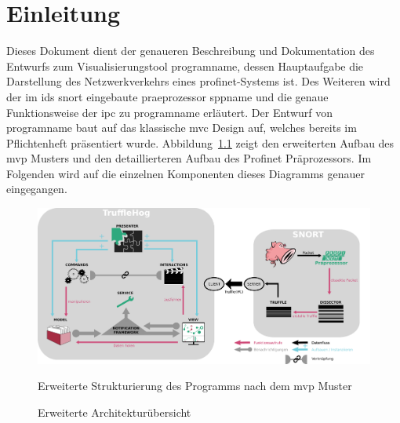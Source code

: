\chapter{Einleitung}
Dieses Dokument dient der genaueren Beschreibung und Dokumentation des Entwurfs zum Visualisierungstool \gls{programname}, dessen Hauptaufgabe die Darstellung des Netzwerkverkehrs eines \gls{profinet}-Systems ist. Des Weiteren wird der im \gls{ids} \gls{snort} eingebaute \gls{praeprozessor} \gls{sppname} und die genaue Funktionsweise der \gls{ipc} zu \gls{programname} erläutert.\newline
 \newline
Der Entwurf von \gls{programname} baut auf das klassische \gls{mvc} Design auf, welches bereits im Pflichtenheft präsentiert wurde. Abbildung~\ref{fig:arch_diagram} zeigt den erweiterten Aufbau des \gls{mvp} Musters und den detaillierteren Aufbau des Profinet Präprozessors. Im Folgenden wird auf die einzelnen Komponenten dieses Diagramms genauer eingegangen.\newline
\begin{figure}[H]
  \centering
  \includegraphics[width=\textwidth]{../diagramimages/arch_diagram_mvp.png}
  \caption[Erweiterte Architekturübersicht]{Erweiterte Architekturübersicht}
  \medskip
  Erweiterte Strukturierung des Programms nach dem \gls{mvp} Muster
  \label{fig:arch_diagram}
\end{figure}\newpage

